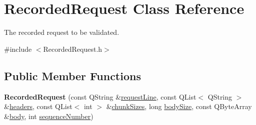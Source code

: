 \hypertarget{class_recorded_request}{\section{Recorded\+Request Class Reference}
\label{class_recorded_request}
}


The recorded request to be validated.  




{\ttfamily \#include $<$Recorded\+Request.\+h$>$}

\subsection*{Public Member Functions}
\begin{DoxyCompactItemize}
\item 
\hypertarget{class_recorded_request_aca317e0e665c6455c3307ae09d67fbdb}{{\bfseries Recorded\+Request} (const Q\+String \&\hyperlink{class_recorded_request_ab2324bf506aa3e1004d161ea5e5ab97e}{request\+Line}, const Q\+List$<$ Q\+String $>$ \&\hyperlink{class_recorded_request_a3ed5bf33c7903c9078e49eae577d127b}{headers}, const Q\+List$<$ int $>$ \&\hyperlink{class_recorded_request_a5335457575099741e9cc75dc0f266a3d}{chunk\+Sizes}, long \hyperlink{class_recorded_request_ae3092b418550fc6d83fb7add89e54a34}{body\+Size}, const Q\+Byte\+Array \&\hyperlink{class_recorded_request_a29a9250993cbf1c33ad427f08ca936cf}{body}, int \hyperlink{class_recorded_request_af40b9720c9aa0074555dbccc43a37d2a}{sequence\+Number})}\label{class_recorded_request_aca317e0e665c6455c3307ae09d67fbdb}


\end{DoxyCompactItemize}
